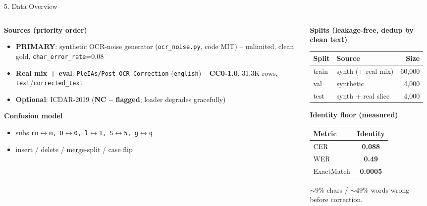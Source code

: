 \documentclass[10pt,aspectratio=169]{beamer}
\begin{document}
\begin{frame}{5. Data Overview}
\begin{columns}[T]
\begin{column}{0.52\textwidth}
\textbf{Sources (priority order)}
\begin{itemize}\small
  \item \textbf{PRIMARY}: synthetic OCR-noise generator (\texttt{ocr\_noise.py}, code MIT) -- unlimited, clean gold, \texttt{char\_error\_rate}=0.08
  \item \textbf{Real mix + eval}: \texttt{PleIAs/Post-OCR-Correction} (\texttt{english}) -- \textbf{CC0-1.0}, 31.3K rows, \texttt{text}/\texttt{corrected\_text}
  \item \textbf{Optional}: ICDAR-2019 (\textbf{NC -- flagged}; loader degrades gracefully)
\end{itemize}

\textbf{Confusion model}
\begin{itemize}\small
  \item subs \texttt{rn$\leftrightarrow$m, O$\leftrightarrow$0, l$\leftrightarrow$1, S$\leftrightarrow$5, g$\leftrightarrow$q}
  \item insert / delete / merge-split / case flip
\end{itemize}
\end{column}
\begin{column}{0.48\textwidth}
\textbf{Splits (leakage-free, dedup by clean text)}
\begin{table}[h]
\centering\small
\begin{tabular}{llr}
\toprule
\textbf{Split} & \textbf{Source} & \textbf{Size} \\
\midrule
train & synth (+ real mix) & 60{,}000 \\
val   & synthetic & 4{,}000 \\
test  & synth + real slice & 4{,}000 \\
\bottomrule
\end{tabular}
\end{table}

\textbf{Identity floor (measured)}
\begin{table}[h]
\centering\small
\begin{tabular}{lc}
\toprule
\textbf{Metric} & \textbf{Identity} \\
\midrule
CER & \textbf{0.088} \\
WER & \textbf{0.49} \\
ExactMatch & \textbf{0.0005} \\
\bottomrule
\end{tabular}
\end{table}
\scriptsize $\sim$9\% chars / $\sim$49\% words wrong before correction.
\end{column}
\end{columns}
\end{frame}
\end{document}

